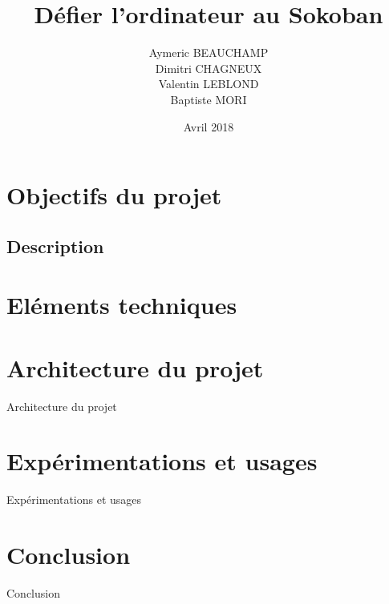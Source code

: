 \documentclass{beamer}
\title{Défier l'ordinateur au Sokoban}
\author{Aymeric BEAUCHAMP\\Dimitri CHAGNEUX\\Valentin LEBLOND\\Baptiste MORI}
\date{Avril 2018}
\begin{document}
 
\maketitle 

\frame{\tableofcontents}

\section{Objectifs du projet}
\subsection{Description}
\begin{frame} %

\end{frame}

\section{Eléments techniques}

\begin{frame}

\end{frame}

\begin{frame}

\end{frame}

\section{Architecture du projet}
\begin{frame}
Architecture du projet
\end{frame}
\section{Expérimentations et usages}
\begin{frame}
Expérimentations et usages
\end{frame}
\section{Conclusion}
\begin{frame}
Conclusion
\end{frame}
\end{document}
